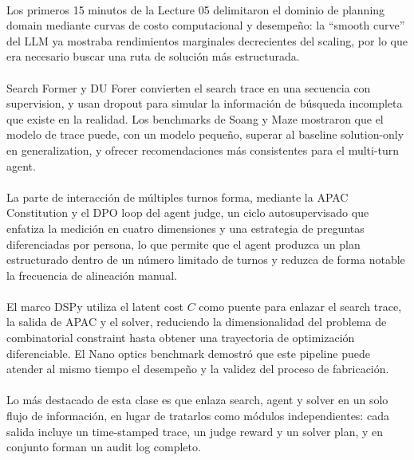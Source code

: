 \documentclass[a4paper]{article}
\begin{document}
\paragraph{}
Los primeros 15 minutos de la Lecture 05 delimitaron el dominio de planning domain mediante curvas de costo computacional y desempeño: la ``smooth curve'' del LLM ya mostraba rendimientos marginales decrecientes del scaling, por lo que era necesario buscar una ruta de solución más estructurada.

\paragraph{}
Search Former y DU Forer convierten el search trace en una secuencia con supervision, y usan dropout para simular la información de búsqueda incompleta que existe en la realidad. Los benchmarks de Soang y Maze mostraron que el modelo de trace puede, con un modelo pequeño, superar al baseline solution-only en generalization, y ofrecer recomendaciones más consistentes para el multi-turn agent.

\paragraph{}
La parte de interacción de múltiples turnos forma, mediante la APAC Constitution y el DPO loop del agent judge, un ciclo autosupervisado que enfatiza la medición en cuatro dimensiones y una estrategia de preguntas diferenciadas por persona, lo que permite que el agent produzca un plan estructurado dentro de un número limitado de turnos y reduzca de forma notable la frecuencia de alineación manual.

\paragraph{}
El marco DSPy utiliza el latent cost \(C\) como puente para enlazar el search trace, la salida de APAC y el solver, reduciendo la dimensionalidad del problema de combinatorial constraint hasta obtener una trayectoria de optimización diferenciable. El Nano optics benchmark demostró que este pipeline puede atender al mismo tiempo el desempeño y la validez del proceso de fabricación.

\paragraph{}
Lo más destacado de esta clase es que enlaza search, agent y solver en un solo flujo de información, en lugar de tratarlos como módulos independientes: cada salida incluye un time-stamped trace, un judge reward y un solver plan, y en conjunto forman un audit log completo.
\end{document}
